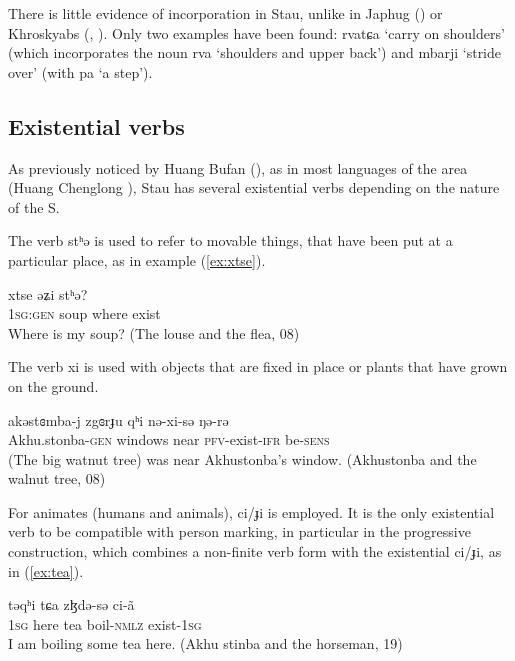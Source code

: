 \documentclass[oneside,a4paper,11pt]{article}
\newcommand{\ipa}[1]{{\phon #1}} %
\begin{document}
 
 There is little evidence of incorporation in Stau, unlike in Japhug (\citealt{jacques12incorp}) or Khroskyabs (\citealt{lai13affixale}, \citealt{lai14person}). Only two examples have been found: \ipa{rvatɕa} `carry on shoulders' (which incorporates the noun \ipa{rva} `shoulders and upper back') and \ipa{mbarji} `stride over' (with \ipa{pa}  `a step').

\subsection{Existential verbs}
As previously noticed by  Huang Bufan (\citeyear[38]{huangbf91daofu}), as in most languages of the area (Huang Chenglong \citeyear{huangcl13cunzai}), Stau has several existential verbs depending on the nature of the S.   

The verb \ipa{stʰə} is used to refer to movable things, that have been put at a particular place, as in example (\ref{ex:xtse}).

\begin{exe}
\ex \label{ex:xtse}
\gll \ipa{ŋi} 	\ipa{xtse} 	\ipa{əʑi} 	\ipa{stʰə?} 	  \\
\textsc{1sg:gen} soup where exist \\
\glt Where is my soup? (The louse and the flea, 08)
\end{exe}
 
The verb \ipa{xi} is used with objects that are fixed in place or plants that have grown on the ground.

\begin{exe}
\ex \label{ex:zgorJu}
\gll
\ipa{akəstɞmba-j} 	\ipa{zgɞrɟu} 	\ipa{qʰi} 	\ipa{nə-xi-sə} 	\ipa{ŋə-rə} \\
Akhu.stonba-\textsc{gen} windows near \textsc{pfv}-exist-\textsc{ifr} be-\textsc{sens} \\
\glt(The big watnut tree) was near Akhustonba's window. (Akhustonba and the walnut tree, 08)
\end{exe}


 For animates (humans and animals),  \ipa{ci/ɟi} is employed. It is the only existential verb to be compatible with person marking, in particular in the progressive construction, which combines a non-finite verb form with the existential \ipa{ci/ɟi}, as in (\ref{ex:tea}).
 
\begin{exe}
\ex \label{ex:tea}
\gll \ipa{ŋa} 	\ipa{təqʰi} 	\ipa{tɕa} 	\ipa{zɮdə-sə} 	\ipa{ci-ã} \\
\textsc{1sg} here tea boil-\textsc{nmlz} exist-\textsc{1sg} \\
\glt I am boiling some tea here. (Akhu stinba and the horseman, 19)
\end{exe}
\end{document}
